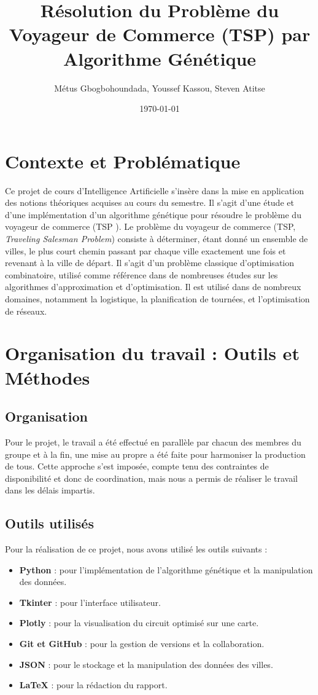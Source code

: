 \documentclass[a4paper,12pt]{article}
\title{Résolution du Problème du Voyageur de Commerce (TSP) par Algorithme Génétique}
\author{Métus Gbogbohoundada, Youssef Kassou, Steven Atitse}
\date{\today}
\begin{document}
\maketitle

\section{Contexte et Problématique}
Ce projet de cours d'Intelligence Artificielle s'insère dans la mise en application des notions théoriques acquises au cours du semestre. Il s'agit d'une étude et d'une implémentation d'un algorithme génétique pour résoudre le problème du voyageur de commerce (TSP \cite{wikipedia_tsp}).
Le problème du voyageur de commerce (TSP, \emph{Traveling Salesman Problem}) consiste à déterminer, étant donné un ensemble de villes, le plus court chemin passant par chaque ville exactement une fois et revenant à la ville de départ. Il s'agit d'un problème classique d'optimisation combinatoire, utilisé comme référence dans de nombreuses études sur les algorithmes d'approximation et d'optimisation.
Il est utilisé dans de nombreux domaines, notamment la logistique, la planification de tournées, et l'optimisation de réseaux.

\section{Organisation du travail : Outils et Méthodes}
\subsection{Organisation}
Pour le projet, le travail a été effectué en parallèle par chacun des membres du groupe et à la fin, une mise au propre a été faite pour harmoniser la production de tous.
Cette approche s'est imposée, compte tenu des contraintes de disponibilité et donc de coordination, mais nous a permis de réaliser le travail dans les délais impartis.

\subsection{Outils utilisés}
Pour la réalisation de ce projet, nous avons utilisé les outils suivants :
\begin{itemize}
    \item \textbf{Python} : pour l'implémentation de l'algorithme génétique et la manipulation des données.
    \item \textbf{Tkinter} : pour l'interface utilisateur.
    \item \textbf{Plotly} : pour la visualisation du circuit optimisé sur une carte.
    \item \textbf{Git et GitHub} : pour la gestion de versions et la collaboration.
    \item \textbf{JSON} : pour le stockage et la manipulation des données des villes.
    \item \textbf{\LaTeX} : pour la rédaction du rapport.
\end{itemize}
\end{document}
